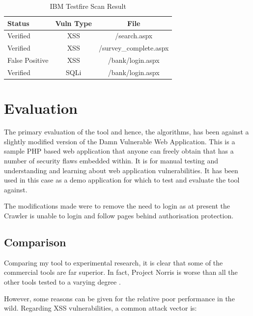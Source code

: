 \documentclass[12pt,a4paper]{article}
\begin{document}
\begin{center}
    \begin{table}
        \caption{IBM Testfire Scan Result}
        \begin{center}
            \begin{tabular}{ | l | c | c | }
                \hline
                Status & Vuln Type & File \\ \hline
                Verified & XSS & /search.aspx \\ \hline
                Verified & XSS & /survey\_complete.aspx \\ \hline
                False Positive & XSS & /bank/login.aspx \\ \hline
                Verified & SQLi & /bank/login.aspx \\ 
                \hline
            \end{tabular}
        \end{center}
        \label{tab:testfire}
    \end{table}
\end{center}

\section{Evaluation}
The primary evaluation of the tool and hence, the algorithms, has been against a slightly modified version of the Damn Vulnerable Web Application.  This is a sample PHP based web application that anyone can freely obtain that has a number of security flaws embedded within.  It is for manual testing and understanding and learning about web application vulnerabilities.  It has been used in this case as a demo application for which to test and evaluate the tool against.

The modifications made were to remove the need to login as at present the Crawler is unable to login and follow pages behind authorisation protection.

\subsection{Comparison}
Comparing my tool to experimental research, it is clear that some of the commercial tools are far superior. In fact, Project Norris is worse than all the other tools tested to a varying degree \cite{Suto2010}.

However, some reasons can be given for the relative poor performance in the wild. Regarding XSS vulnerabilities, a common attack vector is:
\end{document}
